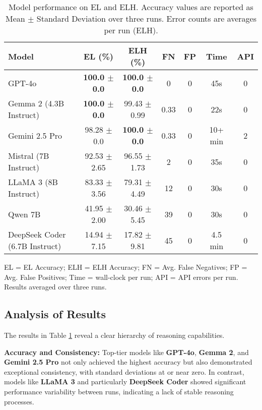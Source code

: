 \documentclass[11pt]{article}
\begin{document}
\begin{table}[htbp]
\centering
\small
\begin{threeparttable}
\caption{Model performance on EL and ELH. Accuracy values are reported as Mean $\pm$ Standard Deviation over three runs. Error counts are averages per run (ELH).}
\label{tab:performance_summary}
\begin{tabular}{lcccccc}
\toprule
Model & EL (\%) & ELH (\%) & FN & FP & Time & API \\
\midrule
GPT-4o                        & \textbf{100.0 $\pm$ 0.0} & \textbf{100.0 $\pm$ 0.0} & 0    & 0 & 45s     & 0 \\
Gemma 2 (4.3B Instruct)       & \textbf{100.0 $\pm$ 0.0} & 99.43 $\pm$ 0.99         & 0.33 & 0 & 22s     & 0 \\
Gemini 2.5 Pro                & 98.28 $\pm$ 0.0          & \textbf{100.0 $\pm$ 0.0} & 0.33 & 0 & 10+ min & 2 \\
Mistral (7B Instruct)         & 92.53 $\pm$ 2.65         & 96.55 $\pm$ 1.73         & 2    & 0 & 35s     & 0 \\
LLaMA 3 (8B Instruct)         & 83.33 $\pm$ 3.56         & 79.31 $\pm$ 4.49         & 12   & 0 & 30s     & 0 \\
Qwen 7B                       & 41.95 $\pm$ 2.00         & 30.46 $\pm$ 5.45         & 39   & 0 & 30s     & 0 \\
DeepSeek Coder (6.7B Instruct)& 14.94 $\pm$ 7.15         & 17.82 $\pm$ 9.81         & 45   & 0 & 4.5 min & 0 \\
\bottomrule
\end{tabular}
\begin{tablenotes}[flushleft]\footnotesize
\item EL = EL Accuracy; ELH = ELH Accuracy; FN = Avg. False Negatives; FP = Avg. False Positives; 
Time = wall-clock per run; API = API errors per run. Results averaged over three runs.
\end{tablenotes}
\end{threeparttable}
\end{table}

\subsection{Analysis of Results}
The results in Table \ref{tab:performance_summary} reveal a clear hierarchy of reasoning capabilities. 

\textbf{Accuracy and Consistency:} Top-tier models like \textbf{GPT-4o}, \textbf{Gemma 2}, and \textbf{Gemini 2.5 Pro} not only achieved the highest accuracy but also demonstrated exceptional consistency, with standard deviations at or near zero. In contrast, models like \textbf{LLaMA 3} and particularly \textbf{DeepSeek Coder} showed significant performance variability between runs, indicating a lack of stable reasoning processes.
\end{document}
